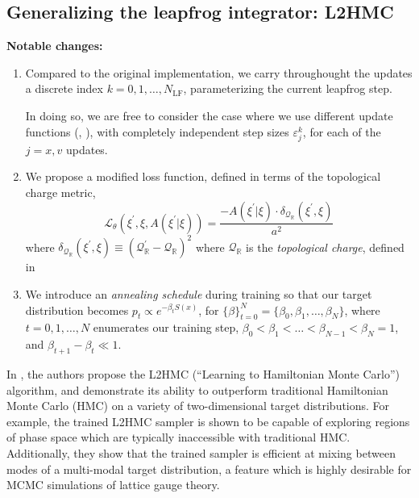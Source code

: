 \documentclass{article} %
\begin{document}
\subsection{\label{sec:l2hmc}Generalizing the leapfrog integrator: L2HMC}
%
\textbf{Notable changes:} 
\begin{enumerate}
   \item Compared to the original implementation, we carry throughought the updates a discrete index \(k = 0, 1, \ldots,
      N_{\mathrm{LF}}\), parameterizing the current leapfrog step.%

      In doing so, we are free to consider the case where we use different update functions
      (, ), with completely independent step sizes
      \(\varepsilon^{k}_{j}\), for each of the \(j = x, v\) updates.
   \item We propose a modified loss function, defined in terms of the topological charge metric,
      \begin{equation}
         \mathcal{L}_{\theta}{\left(\xi^{\prime},\xi,A(\xi^{\prime}|\xi)\right)} =
         \frac{-A(\xi^{\prime}|\xi)\cdot \delta_{\mathcal{Q}_{\mathbb{R}}}(\xi^{\prime}, \xi)}{a^{2}}
      \end{equation}
      where \(\delta_{\mathcal{Q}_{\mathbb{R}}}(\xi^{\prime}, \xi) \equiv%
      {(\mathcal{Q}_{\mathbb{R}}^{\prime} - \mathcal{Q}_{\mathbb{R}})}^{2}\) where \(\mathcal{Q}_{\mathbb{R}}\) is the
      \emph{topological charge}, defined in 
   \item We introduce an \emph{annealing schedule} during training so that our target distribution becomes 
      \(p_{t}\propto e^{-\beta_{t}S(x)}\), for \({\{\beta\}}_{t=0}^{N} = \{\beta_{0}, \beta_{1},
      \ldots, \beta_{N}\}\), where \(t = 0, 1, \ldots, N\) enumerates our training step, \(\beta_{0} < \beta_{1} <
      \ldots < \beta_{N-1} < \beta_{N} = 1\), and \(\beta_{t+1} - \beta_{t} \ll 1\).
\end{enumerate}
%

In \citep{levy2017}, the authors propose the L2HMC (``Learning to Hamiltonian Monte Carlo'') algorithm, and demonstrate
its ability to outperform traditional Hamiltonian Monte Carlo (HMC) on a variety of two-dimensional target
distributions.
%
For example, the trained L2HMC sampler is shown to be capable of exploring regions of phase space which are typically
inaccessible with traditional HMC.\@
%
Additionally, they show that the trained sampler is efficient at mixing between modes of a multi-modal target
distribution, a feature which is highly desirable for MCMC simulations of lattice gauge theory.
%
\end{document}
